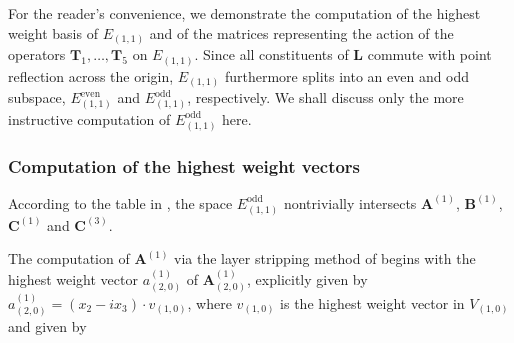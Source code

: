 \documentclass[11pt,reqno]{amsart}
\theoremstyle{remark}
\theoremstyle{definition}
\begin{document}
For the reader's convenience, we demonstrate the computation of the highest weight basis of $E_{(1,1)}$ and of the matrices representing the action of the operators $\mathbf T_1,\ldots,\mathbf T_5$ on $E_{(1,1)}$. Since all constituents of $\mathbf L$ commute with point reflection across the origin, $E_{(1,1)}$ furthermore splits into an even and odd subspace, $E_{(1,1)}^{\mathrm{even}}$ and $E_{(1,1)}^{\mathrm{odd}}$, respectively. We shall discuss only the more instructive computation of $E_{(1,1)}^{\mathrm{odd}}$ here.

\subsubsection{Computation of the highest weight vectors}

According to the table in , the space $E_{(1,1)}^{\mathrm{odd}}$ nontrivially intersects $\mathbf A^{(1)}$, $\mathbf B^{(1)}$, $\mathbf C^{(1)}$ and $\mathbf C^{(3)}$.

The computation of $\mathbf A^{(1)}$ via the layer stripping method of  begins with the highest weight vector $a^{(1)}_{(2,0)}$ of $\mathbf A^{(1)}_{(2,0)}$, explicitly given by $a^{(1)}_{(2,0)} = (x_2 - i x_3) \cdot v_{(1,0)}$, where $v_{(1,0)}$ is the highest weight vector in $V_{(1,0)}$ and given by
\end{document}
